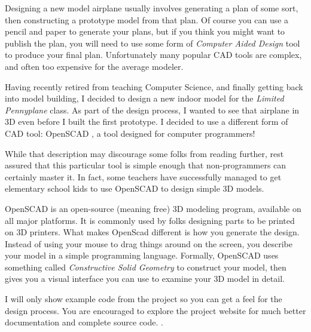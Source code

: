 Designing a new model airplane usually involves generating a plan of some sort,
then constructing a prototype model from that plan. Of course you can use a
pencil and paper to generate your plans, but if you think you might want to
publish the plan, you will need to use some form of {\it Computer Aided Design}
tool to produce your final plan. Unfortunately many popular CAD tools are
complex, and often too expensive for the average modeler.

Having recently retired from teaching Computer Science, and finally getting back into
model building, I decided to design a new indoor model for the {\it Limited
Pennyplane} class. As part of the design process, I wanted to see that airplane
in 3D even before I built the first prototype. I decided to use a different
form of CAD tool: OpenSCAD \cite{openscad}, a tool designed for computer
programmers!

While that description may discourage some folks from reading further, rest
assured that this particular tool is simple enough that non-programmers can
certainly master it. In fact, some teachers have successfully managed to get
elementary school kids to use OpenSCAD to design simple 3D models.

OpenSCAD is an open-source (meaning free) 3D modeling program, available on all
major platforms. It is commonly used by folks designing parts to be printed on
3D printers. What makes OpenScad different is how you generate the design.
Instead of using your mouse to drag things around on the screen, you describe
your model in a simple programming language. Formally, OpenSCAD uses something
called {\it Constructive Solid Geometry} to construct your model, then gives
you a visual interface you can use to examine your 3D model in detail.

I will only show example code from the project so you can get a feel for the
design process. You are encouraged to explore the project website for much
better documentation and complete source code. \cite{blackr}.

